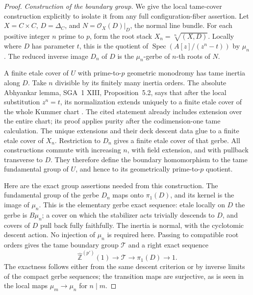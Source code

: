 \begin{proof}
\emph{Construction of the boundary group.}
We give the local tame-cover construction explicitly to
isolate it from any full configuration-fiber assertion.
Let \(X=C\times C\), \(D=\Delta_C\), and
\(N=\mathcal O_X(D)|_D\), the normal line bundle.
For each positive integer \(n\) prime to \(p\), form
the root stack \(X_n=\sqrt[n]{(X,D)}\). Locally where
\(D\) has parameter \(t\), this is the quotient of
\(\operatorname{Spec}(A[z]/(z^n-t))\) by \(\mu_n\).
The reduced inverse image \(D_n\) of \(D\) is the
\(\mu_n\)-gerbe of \(n\)-th roots of \(N\).

A finite etale cover of \(U\) with prime-to-\(p\)
geometric monodromy has tame inertia along \(D\).
Take \(n\) divisible by its finitely many inertia
orders. The absolute Abhyankar lemma, SGA~1 XIII,
Proposition~5.2, says that after the local substitution
\(z^n=t\), its normalization extends uniquely to a
finite etale cover of the whole Kummer chart
\cite{AR_SGA1}. The cited statement already includes
extension over the entire chart; its proof applies
purity after the codimension-one tame calculation.
The unique extensions and their deck
descent data glue to a finite etale cover of \(X_n\).
Restriction to \(D_n\) gives a finite etale cover of
that gerbe. All constructions commute with increasing
\(n\), with field extension, and with pullback
transverse to \(D\). They therefore define the boundary
homomorphism to the tame fundamental group of \(U\),
and hence to its geometrically prime-to-\(p\) quotient.

Here are the exact group assertions needed from this
construction. The fundamental group of the gerbe \(D_n\)
maps onto \(\pi_1(D)\), and its kernel is the image
of \(\mu_n\). This is the elementary gerbe exact
sequence: etale locally on \(D\) the gerbe is
\(B\mu_n\); a cover on which the stabilizer acts
trivially descends to \(D\), and covers of \(D\)
pull back fully faithfully. The inertia is normal,
with the cyclotomic descent action. No injection of
\(\mu_n\) is required here. Passing to compatible
root orders gives the tame boundary group \(\mathcal T\)
and a right exact sequence
\[
 \widehat{\mathbb Z}^{(p')}(1)\longrightarrow\mathcal T
              \longrightarrow\pi_1(D)\longrightarrow1.
                                                        \tag{AG.42.3}
\]
The exactness follows either from the same descent
criterion or by inverse limits of the compact gerbe
sequences; the transition maps are surjective, as is
seen in the local maps \(\mu_m\to\mu_n\) for
\(n\mid m\).


\end{proof}
